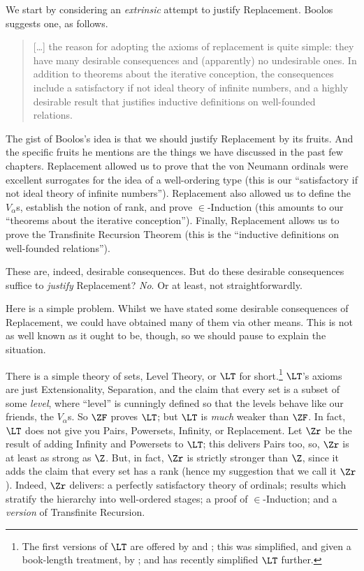 \documentclass[../../../include/open-logic-section]{subfiles}
\begin{document}

We start by considering an \emph{extrinsic} attempt to justify
Replacement. Boolos suggests one, as follows. 
\begin{quote}
  [\ldots] the reason for adopting the axioms of replacement is quite
  simple: they have many desirable consequences and (apparently) no
  undesirable ones. In addition to theorems about the iterative
  conception, the consequences include a satisfactory if not ideal
  theory of infinite numbers, and a highly desirable result that
  justifies inductive definitions on well-founded relations.
  \cite[229]{Boolos1971}
\end{quote}		
The gist of Boolos's idea is that we should justify Replacement by its
fruits. And the specific fruits he mentions are the things we have
discussed in the past few chapters. Replacement allowed us to prove
that the von Neumann ordinals were excellent surrogates for the idea
of a well-ordering type (this is our ``satisfactory if not ideal
theory of infinite numbers''). Replacement also allowed us to define
the $V_\alpha$s, establish the notion of rank, and prove
$\in$-Induction (this amounts to our ``theorems about the iterative
conception''). Finally, Replacement allows us to prove the Transfinite
Recursion Theorem (this is the ``inductive definitions on well-founded
relations''). 

These are, indeed, desirable consequences. But do these desirable
consequences suffice to \emph{justify} Replacement? \emph{No}. Or at
least, not straightforwardly. 

Here is a simple problem. Whilst we have stated some desirable
consequences of Replacement, we could have obtained many of them via
other means. This is not as well known as it ought to be, though, so we should pause to explain the situation. 

There is a simple theory of sets, Level Theory, or $\LT$ for short.\footnote{The first versions of $\LT$ are offered by \cite{Montague1965} and \cite{Scott1974}; this was simplified, and given a book-length treatment, by \cite{Potter2004}; and \cite{ButtonLT1} has recently simplified $\LT$ further.} $\LT$'s axioms are just Extensionality, Separation, and the claim that every set is a subset of some \emph{level}, where ``level'' is cunningly defined so that the levels behave like our friends, the $V_\alpha$s. So $\ZF$ proves $\LT$; but $\LT$ is \emph{much} weaker than $\ZF$. In fact, $\LT$ does not give you Pairs, Powersets, Infinity, or Replacement. Let $\Zr$ be the result of adding Infinity and Powersets to $\LT$; this delivers Pairs too, so, $\Zr$ is at least as strong as $\Z$. But, in fact, $\Zr$ is strictly stronger than $\Z$, since it adds the claim that every set has a rank (hence my suggestion that we call it $\Zr$). Indeed, $\Zr$ delivers: a perfectly satisfactory theory of ordinals;
results which stratify the hierarchy into well-ordered stages; a proof
of $\in$-Induction; and a \emph{version} of Transfinite Recursion. 
\end{document}
